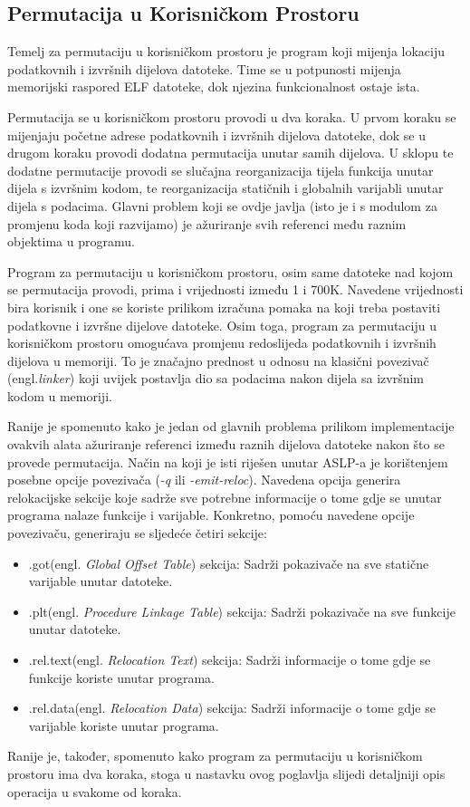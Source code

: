 \documentclass[times, utf8, diplomski, numeric]{fer}
\begin{document}
\subsection{Permutacija u Korisničkom Prostoru}
Temelj za permutaciju u korisničkom prostoru je program koji mijenja lokaciju podatkovnih i izvršnih dijelova datoteke. Time se u potpunosti mijenja memorijski raspored ELF datoteke, dok njezina funkcionalnost ostaje ista.

Permutacija se u korisničkom prostoru provodi u dva koraka. U prvom koraku se mijenjaju početne adrese podatkovnih i izvršnih dijelova datoteke, dok se u drugom koraku provodi dodatna permutacija unutar samih dijelova. U sklopu te dodatne permutacije provodi se slučajna reorganizacija tijela funkcija unutar dijela s izvršnim kodom, te reorganizacija statičnih i globalnih varijabli unutar dijela s podacima. Glavni problem koji se ovdje javlja (isto je i s modulom za promjenu koda koji razvijamo) je ažuriranje svih referenci među raznim objektima u programu.

Program za permutaciju u korisničkom prostoru, osim same datoteke nad kojom se permutacija provodi, prima i vrijednosti između 1 i 700K. Navedene vrijednosti bira korisnik i one se koriste prilikom izračuna pomaka na koji treba postaviti podatkovne i izvršne dijelove datoteke. Osim toga, program za permutaciju u korisničkom prostoru omogućava promjenu redoslijeda podatkovnih i izvršnih dijelova u memoriji. To je značajno prednost u odnosu na klasični povezivač (engl.\emph{linker}) koji uvijek postavlja dio sa podacima nakon dijela sa izvršnim kodom u memoriji.

Ranije je spomenuto kako je jedan od glavnih problema prilikom implementacije ovakvih alata ažuriranje referenci između raznih dijelova datoteke nakon što se provede permutacija. Način na koji je isti riješen unutar ASLP-a je korištenjem posebne opcije povezivača (\emph{-q} ili \emph{-emit-reloc}). Navedena opcija generira relokacijske sekcije koje sadrže sve potrebne informacije o tome gdje se unutar programa nalaze funkcije i varijable. Konkretno, pomoću navedene opcije povezivaču, generiraju se sljedeće četiri sekcije:
\begin{itemize}
\item .got(engl. \emph{Global Offset Table}) sekcija: Sadrži pokazivače na sve statične varijable unutar datoteke.
\item .plt(engl. \emph{Procedure Linkage Table}) sekcija: Sadrži pokazivače na sve funkcije unutar datoteke.
\item .rel.text(engl. \emph{Relocation Text}) sekcija: Sadrži informacije o tome gdje se funkcije koriste unutar programa.
\item .rel.data(engl. \emph{Relocation Data}) sekcija: Sadrži informacije o tome gdje se varijable koriste unutar programa.
\end{itemize}
Ranije je, također, spomenuto kako program za permutaciju u korisničkom prostoru ima dva koraka, stoga u nastavku ovog poglavlja slijedi detaljniji opis operacija u svakome od koraka.
\end{document}

